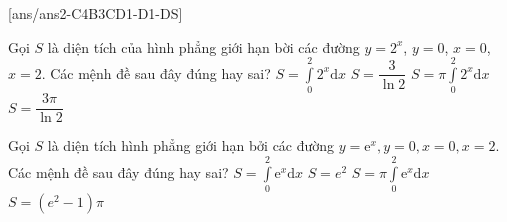 {}[ans/ans2-C4B3CD1-D1-DS]
\begin{ex}%
	Gọi $S$ là diện tích của hình phẳng giới hạn bời các đường $y=2^x$, $y=0$, $x=0$, $x=2$. Các mệnh đề sau đây đúng hay sai?
\choiceTF
{\True $S=\displaystyle\int\limits_0^2 2^x \mathrm{d}x$}
{\True $S=\dfrac{3}{\ln 2}$}
{$S=\pi \displaystyle\int\limits_0^2 2^x \mathrm{d}x$}
{$S=\dfrac{3 \pi}{\ln 2}$}
\loigiai{
\[
S=\displaystyle\int\limits_0^2\left|2^x\right| \mathrm{d}x=\displaystyle\int\limits_0^2 2^x \mathrm{d}x=\dfrac{2^2}{\ln 2}-\dfrac{2^0}{\ln 2}=\dfrac{3}{\ln 2}\left( \text {do } 2^x>0, \forall x \in[0;2]\right) .
\]
}
\end{ex}
\begin{ex}%
	Gọi $S$ là diện tích hình phẳng giới hạn bởi các đường $y=\mathrm{e}^x, y=0, x=0, x=2$. Các mệnh đề sau đây đúng hay sai?
\choiceTF
{\True $S=\displaystyle\int\limits_0^2 \mathrm{e}^x \mathrm{d}x$}
{$S=e^2$}
{$S=\pi \displaystyle\int\limits_0^2 \mathrm{e}^x \mathrm{d}x$}
{$S=\left(e^2-1\right) \pi$}
\end{ex}
